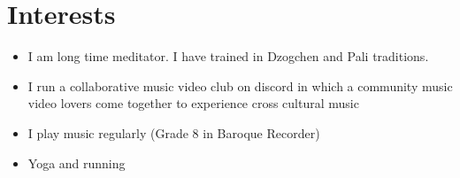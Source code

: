 \documentclass[12pt]{IEEEtran}
\begin{document}
\section*{Interests}

\begin{itemize}
\item I am long time meditator. I have trained in Dzogchen and Pali traditions.
\item I run a collaborative music video club on discord in which a community music video lovers come together to experience cross cultural music
\item I play music regularly (Grade 8 in Baroque Recorder)
\item Yoga and running
\end{itemize}






\newpage


\end{document}
